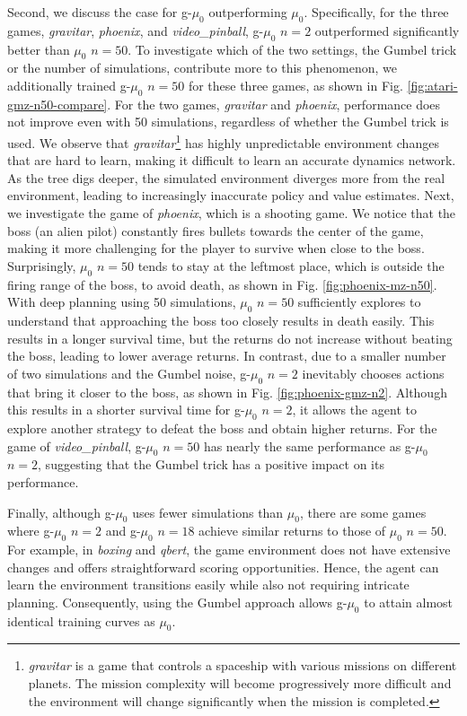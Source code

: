Second, we discuss the case for g-$\mu_0$ outperforming $\mu_0$.
Specifically, for the three games, \textit{gravitar}, \textit{phoenix}, and \textit{video\_pinball}, g-$\mu_0$ $n=2$ outperformed significantly better than $\mu_0$ $n=50$.
To investigate which of the two settings, the Gumbel trick or the number of simulations, contribute more to this phenomenon, we additionally trained g-$\mu_0$ $n=50$ for these three games, as shown in Fig. \ref{fig:atari-gmz-n50-compare}.
For the two games, \textit{gravitar} and \textit{phoenix}, performance does not improve even with 50 simulations, regardless of whether the Gumbel trick is used.
We observe that \textit{gravitar}\footnote{\textit{gravitar} is a game that controls a spaceship with various missions on different planets. The mission complexity will become progressively more difficult and the environment will change significantly when the mission is completed.} has highly unpredictable environment changes that are hard to learn, making it difficult to learn an accurate dynamics network.
As the tree digs deeper, the simulated environment diverges more from the real environment, leading to increasingly inaccurate policy and value estimates.
Next, we investigate the game of \textit{phoenix}, which is a shooting game.
We notice that the boss (an alien pilot) constantly fires bullets towards the center of the game, making it more challenging for the player to survive when close to the boss.
Surprisingly, $\mu_0$ $n=50$ tends to stay at the leftmost place, which is outside the firing range of the boss, to avoid death, as shown in Fig. \ref{fig:phoenix-mz-n50}.
With deep planning using 50 simulations, $\mu_0$ $n=50$ sufficiently explores to understand that approaching the boss too closely results in death easily.
This results in a longer survival time, but the returns do not increase without beating the boss, leading to lower average returns.
In contrast, due to a smaller number of two simulations and the Gumbel noise, g-$\mu_0$ $n=2$ inevitably chooses actions that bring it closer to the boss, as shown in Fig. \ref{fig:phoenix-gmz-n2}.
Although this results in a shorter survival time for g-$\mu_0$ $n=2$, it allows the agent to explore another strategy to defeat the boss and obtain higher returns.
For the game of \textit{video\_pinball}, g-$\mu_0$ $n=50$ has nearly the same performance as g-$\mu_0$ $n=2$, suggesting that the Gumbel trick has a positive impact on its performance.

Finally, although g-$\mu_0$ uses fewer simulations than $\mu_0$, there are some games where g-$\mu_0$ $n=2$ and g-$\mu_0$ $n=18$ achieve similar returns to those of $\mu_0$ $n=50$.
For example, in \textit{boxing} and \textit{qbert}, the game environment does not have extensive changes and offers straightforward scoring opportunities.
Hence, the agent can learn the environment transitions easily while also not requiring intricate planning.
Consequently, using the Gumbel approach allows g-$\mu_0$ to attain almost identical training curves as $\mu_0$.

